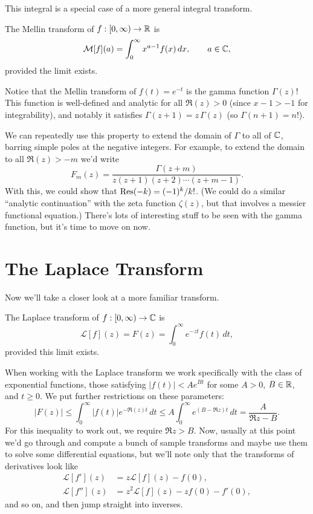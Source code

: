 \documentclass[../m136main.tex]{subfiles}
\begin{document}
This integral is a special case of a more general integral transform.

\begin{definition}
    The Mellin transform of $f : [0, \infty) \to \mathbb{R}$ is
    \[ \mathcal M[f](a) = \int_{0}^{\infty} x^{a - 1} f(x) \,dx, \qquad a \in \mathbb{C}, \]
    provided the limit exists.
\end{definition}

Notice that the Mellin transform of $f(t) = e^{-t}$ is the gamma function $\Gamma(z)$!
This function is well-defined and analytic for all $\Re(z) > 0$ (since $x-1 > -1$ for integrability), and notably it satisfies $\Gamma(z+1) = z \, \Gamma(z)$ (so $\Gamma(n+1) = n!$).

We can repeatedly use this property to extend the domain of $\Gamma$ to all of $\mathbb{C}$, barring simple poles at the negative integers.
For example, to extend the domain to all $\Re(z) > -m$ we'd write
\[ F_m(z) = \frac{\Gamma(z+m)}{z(z+1)(z+2) \cdots (z+m-1)}. \]
With this, we could show that $\operatorname{Res}(-k) = (-1)^{k} / k!$.
(We could do a similar ``analytic continuation'' with the zeta function $\zeta(z)$, but that involves a messier functional equation.)
There's lots of interesting stuff to be seen with the gamma function, but it's time to move on now.

\section{The Laplace Transform}
Now we'll take a closer look at a more familiar transform.

\begin{definition}
    The Laplace transform of $f : [0,\infty) \to \mathbb{C}$ is
    \[ \mathcal L[f](z) = F(z) = \int_{0}^{\infty} e^{-zt} f(t) \,dt, \]
    provided this limit exists.
\end{definition}

When working with the Laplace transform we work specifically with the class of exponential functions, those satisfying $|f(t)| < A e^{Bt}$ for some $A > 0$, $B \in \mathbb{R}$, and $t \geq 0$.
We put further restrictions on these parameters:
\[ |F(z)| \leq \int_{0}^{\infty} |f(t)| e^{-\Re(z) t} \,dt \leq A \int_{0}^{\infty} e^{(B - \Re z)t} \,dt = \frac{A}{\Re z - B}. \]
For this inequality to work out, we require $\Re z > B$.
Now, usually at this point we'd go through and compute a bunch of sample transforms and maybe use them to solve some differential equations, but we'll note only that the transforms of derivatives look like
\begin{align*}
    \mathcal L[f'] (z) &= z \mathcal L[f](z) - f(0), \\
    \mathcal L[f''] (z) &= z^2 \mathcal L[f](z) - z f(0) - f'(0),
\end{align*}
and so on, and then jump straight into inverses.
\end{document}
